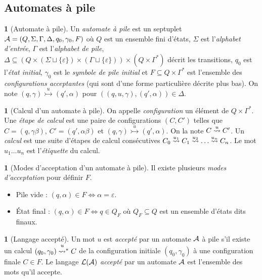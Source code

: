 \documentclass[10pt,a4paper,notitlepage]{article}
\theoremstyle{plain}
\theoremstyle{definition}
\newtheorem{defn}[thm]{\protect\definitionname}
\theoremstyle{definition}
\theoremstyle{remark}
\theoremstyle{remark}
\theoremstyle{plain}
\theoremstyle{plain}
\theoremstyle{plain}
\theoremstyle{remark}
\providecommand{\definitionname}{Définition}
\begin{document}
\subsection{Automates à pile} %



\begin{defn}[Automate à pile]
	Un \emph{automate à pile} est un septuplet $\mathcal{A}=(Q,\Sigma, \Gamma, \Delta, q_0, \gamma_0, F)$ où $Q$ est un ensemble fini d'états, $\Sigma$ est l'\emph{alphabet d'entrée}, $\Gamma$ est l'\emph{alphabet de pile}, $\Delta\subseteq\left(Q\times (\Sigma\sqcup \{\varepsilon\})\times (\Gamma \sqcup \{\varepsilon\})\right)\times\left( Q\times \Gamma^*\right)$ décrit les transitions, $q_0$ est l'\emph{état initial}, $\gamma_0$ est le \emph{symbole de pile initial} et $F\subseteq Q\times\Gamma^*$ est l'ensemble des \emph{configurations acceptantes} (qui sont d'une forme particulière décrite plus bas). On note $(q, \gamma)\overset{u}{\rightarrowtail} (q', \alpha)$ pour $((q,u,\gamma),(q',\alpha))\in \Delta$.
\end{defn}

\begin{defn}[Calcul d'un automate à pile]
	On appelle \emph{configuration} un élément de $Q\times\Gamma^*$. Une \emph{étape de calcul} est une paire de configurations $(C,C')$ telles que $C=(q,\gamma\beta)$, $C'=(q',\alpha\beta)$ et $(q, \gamma)\overset{u}{\rightarrowtail} (q', \alpha)$. On la note $C\overset{u}{\leadsto}C'$. Un \emph{calcul} est une suite d'étapes de calcul consécutives $C_0\overset{u_1}{\leadsto}C_1\overset{u_2}{\leadsto}\dots \overset{u_n}{\leadsto}C_n$. Le mot $u_1\dots u_n$ est l'\emph{étiquette} du calcul.
\end{defn}

\begin{defn}[Modes d'acceptation d'un automate à pile]
	Il existe plusieurs \emph{modes d'acceptation} pour définir $F$.
	\begin{itemize}
		\item Pile vide : $(q,\alpha)\in F \iff \alpha = \varepsilon$.
		\item État final : $(q,\alpha)\in F \iff q\in Q_F$ où $Q_F\subseteq Q$ est un ensemble d'états dits finaux.
	\end{itemize}
\end{defn}

\begin{defn}[Langage accepté]
	Un mot $u$ est \emph{accepté} par un automate $\mathcal{A}$ à pile s'il existe un calcul $(q_0,\gamma_0)\transitionn{u}{*}C$ de la configuration initiale $(q_0,\gamma_0)$ à une configuration finale $C\in F$. Le langage $\mathcal{L}(\mathcal{A})$ \emph{accepté} par un automate $\mathcal{A}$ est l'ensemble des mots qu'il accepte.
\end{defn}
\end{document}
